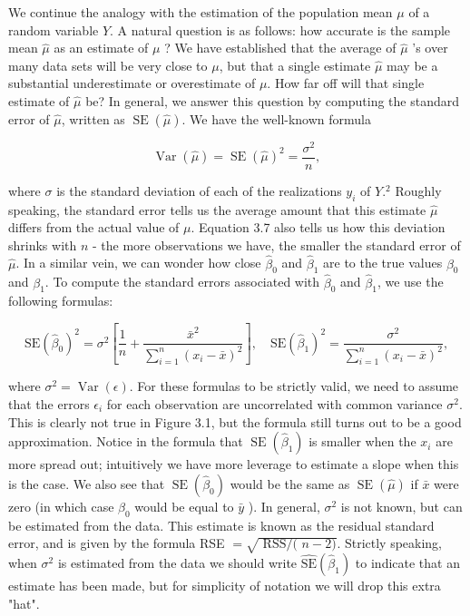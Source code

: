 \documentclass[10pt]{article}
\begin{document}
We continue the analogy with the estimation of the population mean $\mu$ of a random variable $Y$. A natural question is as follows: how accurate is the sample mean $\hat{\mu}$ as an estimate of $\mu$ ? We have established that the average of $\hat{\mu}$ 's over many data sets will be very close to $\mu$, but that a single estimate $\hat{\mu}$ may be a substantial underestimate or overestimate of $\mu$. How far off will that single estimate of $\hat{\mu}$ be? In general, we answer this question by computing the standard error of $\hat{\mu}$, written as $\operatorname{SE}(\hat{\mu})$. We have the well-known formula


\begin{equation*}
\operatorname{Var}(\hat{\mu})=\operatorname{SE}(\hat{\mu})^{2}=\frac{\sigma^{2}}{n}, \tag{3.7}
\end{equation*}


where $\sigma$ is the standard deviation of each of the realizations $y_{i}$ of $Y .{ }^{2}$ Roughly speaking, the standard error tells us the average amount that this estimate $\hat{\mu}$ differs from the actual value of $\mu$. Equation 3.7 also tells us how this deviation shrinks with $n$ - the more observations we have, the smaller the standard error of $\hat{\mu}$. In a similar vein, we can wonder how close $\hat{\beta}_{0}$ and $\hat{\beta}_{1}$ are to the true values $\beta_{0}$ and $\beta_{1}$. To compute the standard errors associated with $\hat{\beta}_{0}$ and $\hat{\beta}_{1}$, we use the following formulas:


\begin{equation*}
\mathrm{SE}\left(\hat{\beta}_{0}\right)^{2}=\sigma^{2}\left[\frac{1}{n}+\frac{\bar{x}^{2}}{\sum_{i=1}^{n}\left(x_{i}-\bar{x}\right)^{2}}\right], \quad \mathrm{SE}\left(\hat{\beta}_{1}\right)^{2}=\frac{\sigma^{2}}{\sum_{i=1}^{n}\left(x_{i}-\bar{x}\right)^{2}}, \tag{3.8}
\end{equation*}


where $\sigma^{2}=\operatorname{Var}(\epsilon)$. For these formulas to be strictly valid, we need to assume that the errors $\epsilon_{i}$ for each observation are uncorrelated with common variance $\sigma^{2}$. This is clearly not true in Figure 3.1, but the formula still turns out to be a good approximation. Notice in the formula that $\operatorname{SE}\left(\hat{\beta}_{1}\right)$ is smaller when the $x_{i}$ are more spread out; intuitively we have more leverage to estimate a slope when this is the case. We also see that $\operatorname{SE}\left(\hat{\beta}_{0}\right)$ would be the same as $\operatorname{SE}(\hat{\mu})$ if $\bar{x}$ were zero (in which case $\hat{\beta}_{0}$ would be equal to $\bar{y}$ ). In general, $\sigma^{2}$ is not known, but can be estimated from the data. This estimate is known as the residual standard error, and is given by the formula RSE $=\sqrt{\text { RSS/( } n-2)}$. Strictly speaking, when $\sigma^{2}$ is estimated from the data we should write $\widehat{\mathrm{SE}}\left(\hat{\beta}_{1}\right)$ to indicate that an estimate has been made, but for simplicity of notation we will drop this extra "hat".
\end{document}
